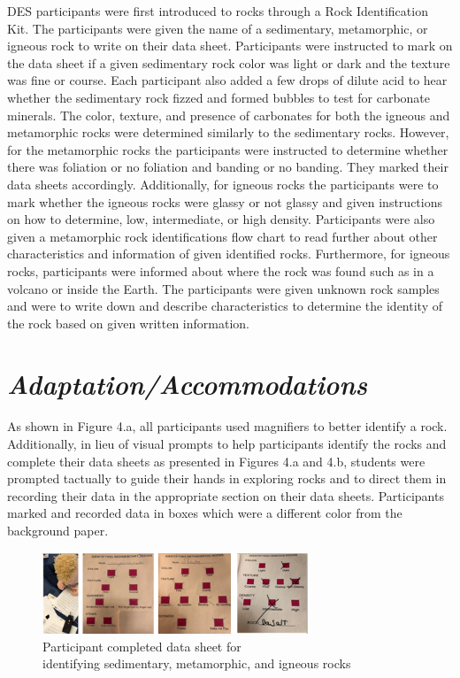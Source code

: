\documentclass[11.5pt]{sig-alternate}
\begin{document}
\begin{large}
DES participants were first introduced to rocks through a Rock Identification Kit. The participants were given the name of a sedimentary, metamorphic, or igneous rock to write on their data sheet.  Participants were instructed to mark on the data sheet if a given sedimentary rock color was light or dark and the texture was fine or course.  Each participant also added a few drops of dilute acid to hear whether the sedimentary rock fizzed and formed bubbles to test for carbonate minerals. The color, texture, and presence of carbonates for both the igneous and metamorphic rocks were determined similarly to the sedimentary rocks. However, for the metamorphic rocks the participants were instructed to determine whether there was foliation or no foliation and banding or no banding. They marked their data sheets accordingly.  Additionally, for igneous rocks the participants were to mark whether the igneous rocks were glassy or not glassy and given instructions on how to determine, low, intermediate, or high density. Participants were also given a metamorphic rock identifications flow chart to read further about other characteristics and information of given identified rocks. Furthermore, for igneous rocks, participants were informed about where the rock was found such as in a volcano or inside the Earth. The participants were given unknown rock samples and were to write down and describe characteristics to determine the identity of the rock based on given written information.  

\section*{\textit{Adaptation/Accommodations}}
  
As shown in Figure 4.a, all participants used magnifiers to better identify a rock.  Additionally, in lieu of visual prompts to help participants identify the rocks and complete their data sheets as presented in Figures 4.a and 4.b, students were prompted tactually to guide their hands in exploring rocks and to direct them in recording their data in the appropriate section on their data sheets. Participants marked and recorded data in boxes which were a different color from the background paper.

\begin{figure}[h]
   \renewcommand{\thefigure}{4a}
        \centering
        \includegraphics[width=8cm]{figure4_1.png}
        \caption{Participant completed data sheet for \\identifying sedimentary, metamorphic, and igneous rocks }
        \label{Participant completed data sheet }
    \end{figure}


\end{large}
\end{document}
